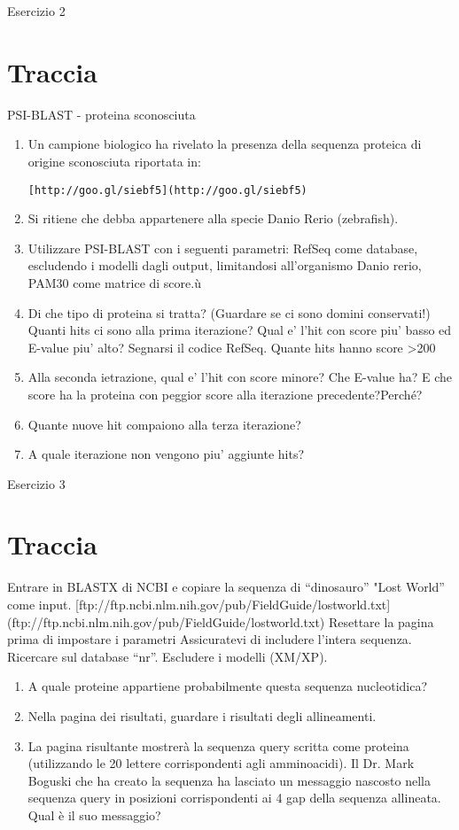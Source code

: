 \documentclass{article}
\begin{document}
\begin{center}
   \huge
   Esercizio 2
\end{center}
\section*{Traccia}
PSI-BLAST - proteina sconosciuta
\begin{enumerate}
   \item Un campione biologico ha rivelato la presenza della sequenza proteica di origine sconosciuta riportata in:
   \begin{verbatim}[http://goo.gl/siebf5](http://goo.gl/siebf5)\end{verbatim}
   \item Si ritiene che debba appartenere alla specie Danio Rerio (zebrafish).
   \item Utilizzare PSI-BLAST con i seguenti parametri: RefSeq come database, escludendo i modelli dagli output, limitandosi all’organismo Danio rerio, PAM30 come matrice di score.ù
   \item Di che tipo di proteina si tratta? (Guardare se ci sono domini conservati!) Quanti hits ci sono alla prima iterazione? Qual e’ l’hit con score piu’ basso ed E-value piu’ alto? Segnarsi il codice RefSeq. Quante hits hanno score >200
   \item Alla seconda ietrazione, qual e’ l’hit con score minore? Che E-value ha? E che score ha la proteina con peggior score alla iterazione precedente?Perché?
   \item Quante nuove hit compaiono alla terza iterazione?
   \item A quale iterazione non vengono piu’ aggiunte hits?
\end{enumerate}

\begin{center}
   \huge
   Esercizio 3
\end{center}
\section*{Traccia}
Entrare in BLASTX di NCBI e copiare la sequenza di “dinosauro” "Lost World” come input.
[ftp://ftp.ncbi.nlm.nih.gov/pub/FieldGuide/lostworld.txt](ftp://ftp.ncbi.nlm.nih.gov/pub/FieldGuide/lostworld.txt)
Resettare la pagina prima di impostare i parametri Assicuratevi di includere l'intera sequenza. Ricercare sul database “nr”. Escludere i modelli (XM/XP).
\begin{enumerate}
   \item A quale proteine appartiene probabilmente questa sequenza nucleotidica?
   \item Nella pagina dei risultati, guardare i risultati degli allineamenti.
   \item La pagina risultante mostrerà la sequenza query scritta come proteina (utilizzando le 20 lettere corrispondenti agli amminoacidi). Il Dr. Mark Boguski che ha creato la sequenza ha lasciato un messaggio nascosto nella sequenza query in posizioni corrispondenti ai 4 gap della sequenza allineata. Qual è il suo messaggio?
\end{enumerate}
\end{document}

